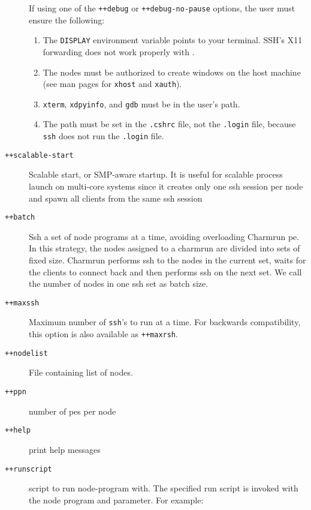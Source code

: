 \begin{description}
If using one of the {\tt ++debug} or {\tt ++debug-no-pause} options,
the user must ensure the following:
\begin{enumerate}

\item The {\tt DISPLAY} environment variable points to your terminal.
SSH's X11 forwarding does not work properly with \charmpp{}.

\item The nodes must be authorized to create windows on the host machine (see
man pages for {\tt xhost} and {\tt xauth}).

\item {\tt xterm}, {\tt xdpyinfo},  and {\tt gdb} must be in
the user's path.

\item The path must be set in the {\tt .cshrc} file, not the {\tt .login}
file, because {\tt ssh} does not run the {\tt .login} file.

\end{enumerate}

\item[{\tt ++scalable-start}]   Scalable start, or SMP-aware startup. It is useful for scalable process launch on multi-core systems since it creates only one ssh session per node and spawn all clients from the same ssh session

\item[{\tt ++batch}]            Ssh a set of node programs at a time, avoiding overloading Charmrun pe.  In this strategy, the nodes assigned to a charmrun are divided into sets of fixed size. Charmrun performs ssh to the nodes in the current set, waits for the clients to connect back and then performs ssh on the next set. We call the number of nodes in one ssh set as batch size.

\item[{\tt ++maxssh}] Maximum number of {\tt ssh}'s to run at a
time. For backwards compatibility, this option is also available as {\tt ++maxrsh}.

\item[{\tt ++nodelist}] File containing list of nodes.


\item[{\tt ++ppn}]              number of pes per node

\item[{\tt ++help}]             print help messages

\item[{\tt ++runscript}]        script to run node-program with. The specified run script is invoked with the node program and parameter. For example:


\end{description}

